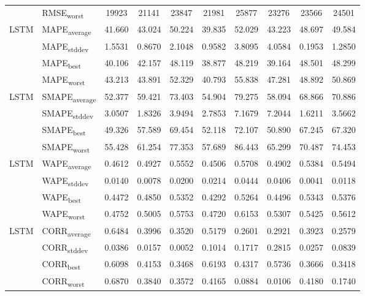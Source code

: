 {\begin{longtable}{l l c c c c c c c c}
 & RMSE\textsubscript{worst} & 19923 & 21141 & 23847 & 21981 & 25877 & 23276 & 23566 & 24501 \\
\cmidrule(lr){2-10}
\multirow{4}{*}{LSTM} & MAPE\textsubscript{average} & 41.660 & 43.024 & 50.224 & 39.835 & 52.029 & 43.223 & 48.697 & 49.584 \\
 & MAPE\textsubscript{stddev} & 1.5531 & 0.8670 & 2.1048 & 0.9582 & 3.8095 & 4.0584 & 0.1953 & 1.2850 \\
 & MAPE\textsubscript{best} & 40.106 & 42.157 & 48.119 & 38.877 & 48.219 & 39.164 & 48.501 & 48.299 \\
 & MAPE\textsubscript{worst} & 43.213 & 43.891 & 52.329 & 40.793 & 55.838 & 47.281 & 48.892 & 50.869 \\
\cmidrule(lr){2-10}
\multirow{4}{*}{LSTM} & SMAPE\textsubscript{average} & 52.377 & 59.421 & 73.403 & 54.904 & 79.275 & 58.094 & 68.866 & 70.886 \\
 & SMAPE\textsubscript{stddev} & 3.0507 & 1.8326 & 3.9494 & 2.7853 & 7.1679 & 7.2044 & 1.6211 & 3.5662 \\
 & SMAPE\textsubscript{best} & 49.326 & 57.589 & 69.454 & 52.118 & 72.107 & 50.890 & 67.245 & 67.320 \\
 & SMAPE\textsubscript{worst} & 55.428 & 61.254 & 77.353 & 57.689 & 86.443 & 65.299 & 70.487 & 74.453 \\
\cmidrule(lr){2-10}
\multirow{4}{*}{LSTM} & WAPE\textsubscript{average} & 0.4612 & 0.4927 & 0.5552 & 0.4506 & 0.5708 & 0.4902 & 0.5384 & 0.5494 \\
 & WAPE\textsubscript{stddev} & 0.0140 & 0.0078 & 0.0200 & 0.0214 & 0.0444 & 0.0406 & 0.0041 & 0.0118 \\
 & WAPE\textsubscript{best} & 0.4472 & 0.4850 & 0.5352 & 0.4292 & 0.5264 & 0.4496 & 0.5343 & 0.5376 \\
 & WAPE\textsubscript{worst} & 0.4752 & 0.5005 & 0.5753 & 0.4720 & 0.6153 & 0.5307 & 0.5425 & 0.5612 \\
\cmidrule(lr){2-10}
\multirow{4}{*}{LSTM} & CORR\textsubscript{average} & 0.6484 & 0.3996 & 0.3520 & 0.5179 & 0.2601 & 0.2921 & 0.3923 & 0.2579 \\
 & CORR\textsubscript{stddev} & 0.0386 & 0.0157 & 0.0052 & 0.1014 & 0.1717 & 0.2815 & 0.0257 & 0.0839 \\
 & CORR\textsubscript{best} & 0.6098 & 0.4153 & 0.3468 & 0.6193 & 0.4317 & 0.5736 & 0.3666 & 0.3418 \\
 & CORR\textsubscript{worst} & 0.6870 & 0.3840 & 0.3572 & 0.4165 & 0.0884 & 0.0106 & 0.4180 & 0.1740 \\

\end{longtable}}
